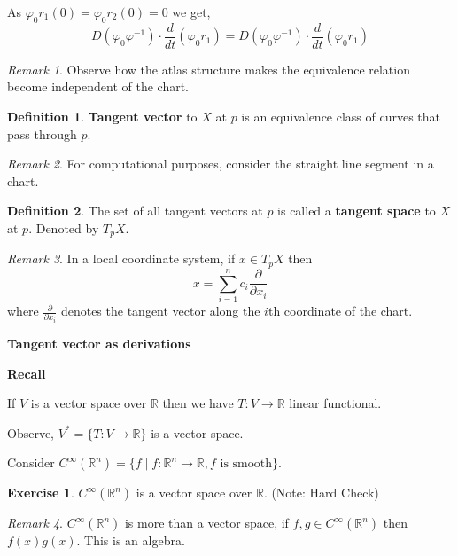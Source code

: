 \documentclass[11pt]{article}
\theoremstyle{definition}
\newtheorem{definition}{Definition}[section]
\newtheorem{exercise}{Exercise}
\theoremstyle{remark}
\newtheorem{remark}{Remark}[section]
\begin{document}
As $\varphi_0 r_1(0) = \varphi_0 r_2(0) = 0$ we get,
\[
D(\varphi_0 \varphi^{-1}) \cdot \frac{d}{dt} (\varphi_0 r_1)
= D(\varphi_0 \varphi^{-1}) \cdot \frac{d}{dt} (\varphi_0 r_1)
\]

\begin{remark}
Observe how the atlas structure makes the equivalence relation become independent of the chart.
\end{remark}

\begin{definition}\label{def:tangent_vector}
\textbf{Tangent vector} to $X$ at $p$ is an equivalence class of curves that pass through $p$.
\end{definition}

\begin{remark}\label{rem:computational_purpose}
For computational purposes, consider the straight line segment in a chart.
\end{remark}

\begin{definition}\label{def:tangent_space}
The set of all tangent vectors at $p$ is called a \textbf{tangent space} to $X$ at $p$. Denoted by $T_p X$.
\end{definition}

\begin{remark}\label{rem:local_coordinate}
In a local coordinate system, if $x \in T_p X$ then
\[
x = \sum_{i=1}^n c_i \frac{\partial}{\partial x_i}
\]
where $\frac{\partial}{\partial x_i}$ denotes the tangent vector along the $i$th coordinate of the chart.
\end{remark}

\textbf{Tangent vector as derivations}

\textbf{Recall}

If $V$ is a vector space over $\mathbb{R}$ then we have $T: V \to \mathbb{R}$ linear functional.

Observe, $V^* = \{T: V \to \mathbb{R}\}$ is a vector space.

Consider $C^\infty(\mathbb{R}^n) = \{f \mid f: \mathbb{R}^n \to \mathbb{R}, f \text{ is smooth}\}$.

\begin{exercise}
$C^\infty(\mathbb{R}^n)$ is a vector space over $\mathbb{R}$. (Note: Hard Check)
\end{exercise}

\begin{remark}
$C^\infty(\mathbb{R}^n)$ is more than a vector space, if $f, g \in C^\infty(\mathbb{R}^n)$ then $f(x)g(x)$. This is an algebra.
\end{remark}
\end{document}
